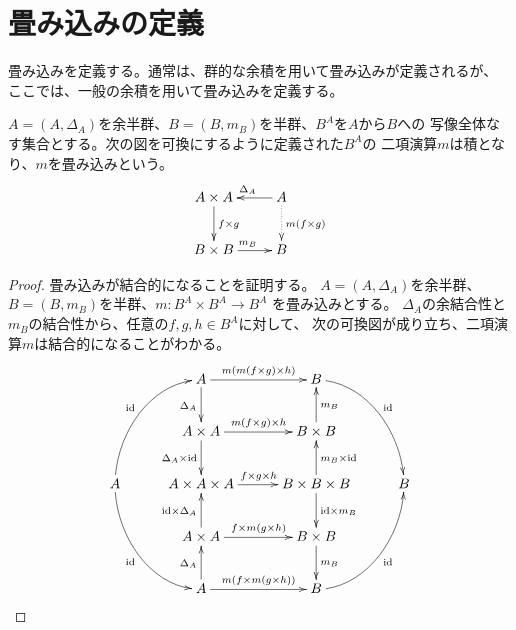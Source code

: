%
\section{畳み込みの定義}\label{s2:畳み込みの定義} %
	畳み込みを定義する。通常は、群的な余積を用いて畳み込みが定義されるが、
	ここでは、一般の余積を用いて畳み込みを定義する。

	\begin{definition}\label{def:畳み込み} %
		$A=(A,\Delta_A)$を余半群、$B=(B,m_B)$を半群、$B^A$を$A$から$B$への
		写像全体なす集合とする。次の図を可換にするように定義された$B^A$の
		二項演算$m$は積となり、$m$を畳み込みという。
		\begin{equation}\xymatrix{ %
			A \times A \ar[d]^{f \times g} & A \ar[l]_{\Delta_A} \ar@{.>}[d]^{m(f \times g)} \\
			B \times B \ar[r]^{m_B} & B \\
		}\end{equation} %
	\end{definition} %
	\begin{proof} %
		畳み込みが結合的になることを証明する。
		$A=(A,\Delta_A)$を余半群、$B=(B,m_B)$を半群、$m:B^A\times B^A\to B^A$
		を畳み込みとする。
		$\Delta_A$の余結合性と$m_B$の結合性から、任意の$f,g,h\in B^A$に対して、
		次の可換図が成り立ち、二項演算$m$は結合的になることがわかる。
		\begin{equation*}\label{eq:誘導された二項演算の結合性}\xymatrix@C+1ex{
			& A \ar[d]_{\Delta_A} \ar[r]^{m(m(f\times g)\times h)}
			& B \ar@(r,u)[rdd]^{\myid} 
			\\
			& A\times A \ar[d]_{\Delta_A\times \myid} \ar[r]^{m(f\times g)\times h}
			& B\times B \ar[u]_{m_B}
			\\
		A \ar@(u,l)[ruu]^{\myid} \ar@(d,l)[rdd]_{\myid} 
			& A\times A\times A \ar[r]^{f\times g\times h}
			& B\times B\times B \ar[u]_{m_B\times \myid} \ar[d]^{\myid\times m_B}
			& B 
			\\
			& A\times A \ar[u]^{\myid\times \Delta_A} \ar[r]^{f\times m(g\times h)}
			& B\times B \ar[d]^{m_B}
			\\
			& A \ar[u]^{\Delta_A} \ar[r]^{m(f\times m(g\times h))}
			& B \ar@(r,d)[ruu]_{\myid}
		\\
		}\end{equation*}
	\end{proof} %

